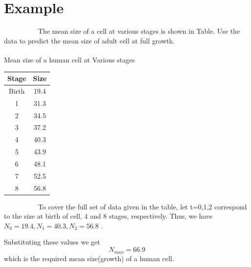 \section*{Example}  
\par ~~~~~~~~~~The mean size of a cell at various stages is shown in Table. Use the data to predict the mean size of adult cell at full growth.  \\
\\    
\newpage  
Mean size of a human cell at Various stages
\\ 
\begin{center}
	\begin{tabular}{|c|c|}
		\hline
		Stage & Size \\
		\hline
		Birth & 19.4 \\
		\hline
		1 & 31.3 \\
		\hline
		2 & 34.5 \\
		\hline
		3 & 37.2 \\
		\hline
		4 & 40.3 \\
		\hline
		5 & 43.9 \\
		\hline
		6 & 48.1 \\
		\hline
		7 & 52.5 \\
		\hline
		8 & 56.8 \\
		\hline
	\end{tabular}
\end{center}                   



~~~~~~~~~~To cover the full set of data given in the table, let t=0,1,2 correspond to the size at birth of cell, 4 and 8 stages, respectively. Thus, we have
$N_{0}=19.4, N_{1}=40.3, N_{2}=56.8$ .
\par  Substituting these values  we get  \\                              $$N_{max}= 66.9$$ which is the required mean size(growth) of a human cell.



